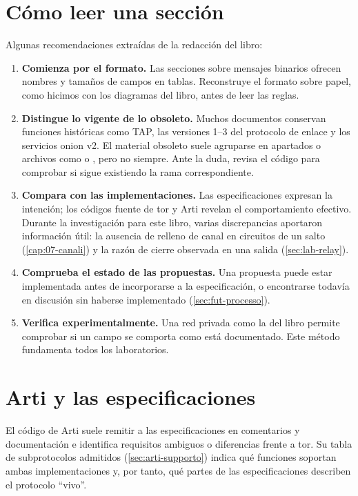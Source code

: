 \section{Cómo leer una sección}\label{sec:C-lettura}

Algunas recomendaciones extraídas de la redacción del libro:
\begin{enumerate}
  \item \textbf{Comienza por el formato.} Las secciones sobre mensajes binarios ofrecen nombres y tamaños de campos en tablas. Reconstruye el formato sobre papel, como hicimos con los diagramas del libro, antes de leer las reglas.
  \item \textbf{Distingue lo vigente de lo obsoleto.} Muchos documentos conservan funciones históricas como TAP, las versiones 1--3 del protocolo de enlace y los servicios onion v2. El material obsoleto suele agruparse en apartados o archivos como  o , pero no siempre. Ante la duda, revisa el código para comprobar si sigue existiendo la rama correspondiente.
  \item \textbf{Compara con las implementaciones.} Las especificaciones expresan la intención; los códigos fuente de tor y Arti revelan el comportamiento efectivo. Durante la investigación para este libro, varias discrepancias aportaron información útil: la ausencia de relleno de canal en circuitos de un salto (\cref{cap:07-canali}) y la razón de cierre observada en una salida (\cref{sec:lab-relay}).
  \item \textbf{Comprueba el estado de las propuestas.} Una propuesta puede estar implementada antes de incorporarse a la especificación, o encontrarse todavía en discusión sin haberse implementado (\cref{sec:fut-processo}).
  \item \textbf{Verifica experimentalmente.} Una red privada como la del libro permite comprobar si un campo se comporta como está documentado. Este método fundamenta todos los laboratorios.
\end{enumerate}

\section{Arti y las especificaciones}\label{sec:C-arti}

El código de Arti suele remitir a las especificaciones en comentarios y documentación e identifica requisitos ambiguos o diferencias frente a tor. Su tabla de subprotocolos admitidos (\cref{sec:arti-supporto}) indica qué funciones soportan ambas implementaciones y, por tanto, qué partes de las especificaciones describen el protocolo \enquote{vivo}.
